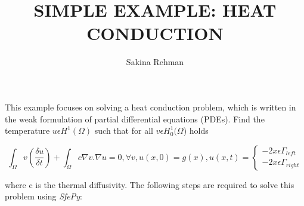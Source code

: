 \documentclass{article}
\title{\bf SIMPLE EXAMPLE: HEAT CONDUCTION}
\author{Sakina Rehman}
\begin{document}
\maketitle

\noindent This example focuses on solving a heat conduction problem, which is written in the weak formulation of partial differential equations (PDEs). Find the temperature $u \epsilon H^1(\Omega)$ such that for all $v \epsilon H_0^1(\Omega$) holds \newline


\[
    \int_\Omega v(\frac{\delta u}{\delta t}) + \int_\Omega c\nabla v.\nabla u = 0, \forall v, u(x,0) = g(x), u(x,t) = 
\begin{cases}
    -2   x \epsilon \Gamma_{left}\\
    -2   x \epsilon \Gamma_{right}
\end{cases}
\]

\noindent where c is the thermal diffusivity. The following steps are required to solve this problem using \emph{SfePy}:
\end{document}
